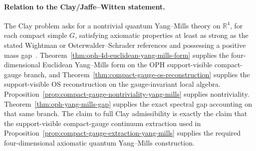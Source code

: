\paragraph{Relation to the Clay/Jaffe--Witten statement.}
The Clay problem asks for a nontrivial quantum Yang--Mills theory on \(\mathbb R^4\), for each
compact simple \(G\), satisfying axiomatic properties at least as strong as the stated Wightman or
Osterwalder--Schrader references and possessing a positive mass gap~\cite{jaffeWittenYM,clayYM}.
Theorem~\ref{thm:oph-4d-euclidean-yang-mills-form} supplies the four-dimensional Euclidean
Yang--Mills form on the OPH support-visible compact-gauge branch, and
Theorem~\ref{thm:compact-gauge-os-reconstruction} supplies the support-visible OS reconstruction
on the gauge-invariant local algebra. Proposition~\ref{prop:compact-gauge-nontriviality-yang-mills}
supplies nontriviality. 
Theorem~\ref{thm:oph-yang-mills-gap} supplies the exact spectral gap accounting on that same
branch. The claim to full Clay admissibility is exactly the claim that the support-visible
compact-gauge continuum extraction used in
Proposition~\ref{prop:compact-gauge-extraction-yang-mills} supplies the required
four-dimensional axiomatic quantum Yang--Mills construction.
